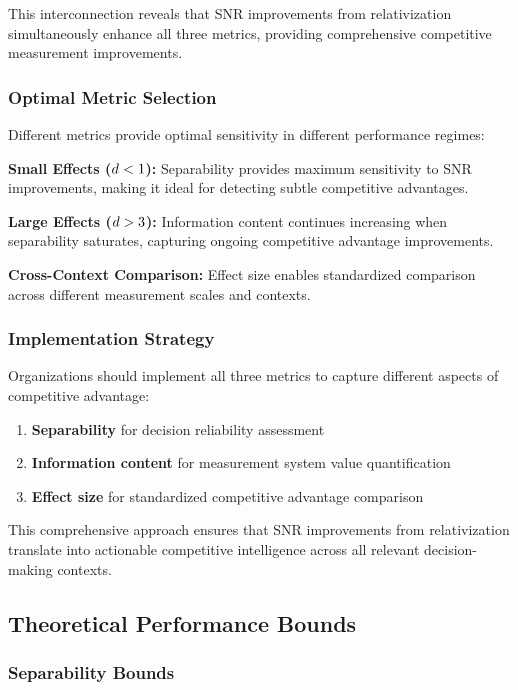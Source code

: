 This interconnection reveals that SNR improvements from relativization simultaneously enhance all three metrics, providing comprehensive competitive measurement improvements.

\subsubsection{Optimal Metric Selection}

Different metrics provide optimal sensitivity in different performance regimes:

\textbf{Small Effects ($d < 1$):} Separability provides maximum sensitivity to SNR improvements, making it ideal for detecting subtle competitive advantages.

\textbf{Large Effects ($d > 3$):} Information content continues increasing when separability saturates, capturing ongoing competitive advantage improvements.

\textbf{Cross-Context Comparison:} Effect size enables standardized comparison across different measurement scales and contexts.

\subsubsection{Implementation Strategy}

Organizations should implement all three metrics to capture different aspects of competitive advantage:

\begin{enumerate}
\item \textbf{Separability} for decision reliability assessment
\item \textbf{Information content} for measurement system value quantification  
\item \textbf{Effect size} for standardized competitive advantage comparison
\end{enumerate}

This comprehensive approach ensures that SNR improvements from relativization translate into actionable competitive intelligence across all relevant decision-making contexts.

\subsection{Theoretical Performance Bounds}

\subsubsection{Separability Bounds}


